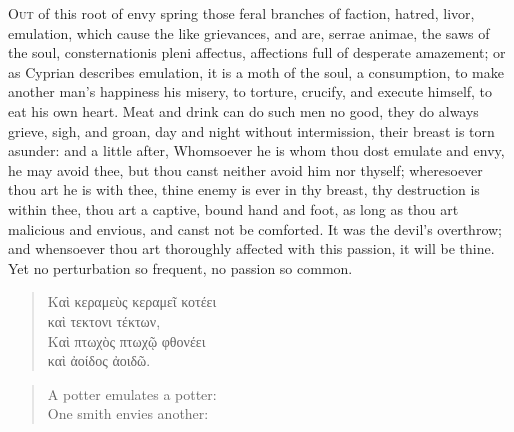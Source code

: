 {\lettrine{O}{ut} of this root of envy spring those feral branches of faction,
hatred, livor, emulation, which cause the like grievances, and are,
serrae animae, the saws of the soul, consternationis pleni
affectus, affections full of desperate amazement; or as Cyprian
describes emulation, it is a moth of the soul, a consumption, to
make another man's happiness his misery, to torture, crucify, and
execute himself, to eat his own heart. Meat and drink can do such men
no good, they do always grieve, sigh, and groan, day and night without
intermission, their breast is torn asunder: and a little after,
Whomsoever he is whom thou dost emulate and envy, he may avoid
thee, but thou canst neither avoid him nor thyself; wheresoever thou
art he is with thee, thine enemy is ever in thy breast, thy destruction
is within thee, thou art a captive, bound hand and foot, as long as
thou art malicious and envious, and canst not be comforted. It was the
devil's overthrow; and whensoever thou art thoroughly affected with
this passion, it will be thine. Yet no perturbation so frequent, no
passion so common.
%
\begin{verse}
\textgreek[variant=ancient]{Καὶ κεραμεὺς κεραμεῖ κοτέει\\
καὶ τεκτονι τέκτων},\\
\textgreek[variant=ancient]{Καὶ πτωχὸς πτωχῷ φθονέει\\
καὶ ἀοίδος ἀοιδῶ.}
\end{verse}
\translationrule
\begin{verse}
A potter emulates a potter:\\
One smith envies another:\\


\end{verse}}
